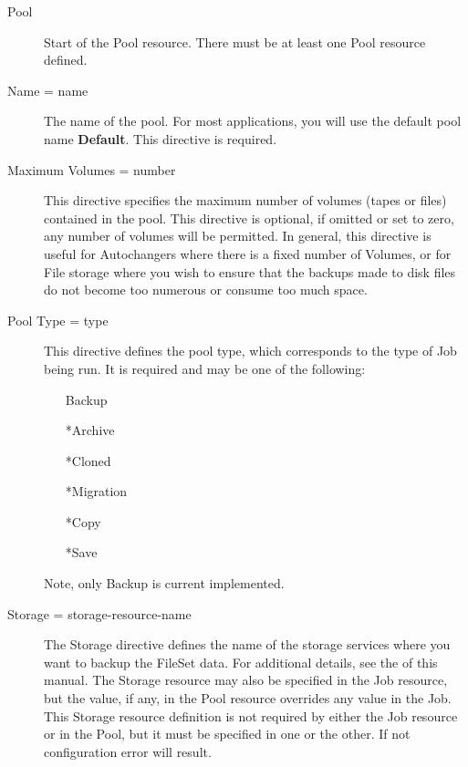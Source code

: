 \begin{description}

\item [Pool]
   Start of the Pool resource.  There must be at least one Pool resource
   defined.


\item [Name = \lt{}name\gt{}]
   The name of the pool.  For most applications, you will use the default
   pool name {\bf Default}.  This directive is required.

\label{MaxVolumes}
\item [Maximum Volumes = \lt{}number\gt{}]
   This directive specifies the maximum number of volumes (tapes or files)
   contained in the pool.  This directive is optional, if omitted or set to
   zero, any number of volumes will be permitted.  In general, this
   directive is useful for Autochangers where there is a fixed number of
   Volumes, or for File storage where you wish to ensure that the backups
   made to disk files do not become too numerous or consume too much space.

\item [Pool Type = \lt{}type\gt{}]
   This directive defines the pool type, which corresponds to the type of
   Job being run.  It is required and may be one of the following:

\begin{itemize}
  \item [Backup]  
  \item [*Archive]  
  \item [*Cloned]  
  \item [*Migration]  
  \item [*Copy]  
  \item [*Save]  
\end{itemize}
   Note, only Backup is current implemented.

\item [Storage = \lt{}storage-resource-name\gt{}]
   The Storage directive defines the name of the storage services where you
   want to backup the FileSet data.  For additional details, see the
    of this manual.
   The Storage resource may also be specified in the Job resource,
   but the value, if any, in the Pool resource overrides any value
   in the Job. This Storage resource definition is not required by either
   the Job resource or in the Pool, but it must be specified in
   one or the other.  If not configuration error will result.


\end{description}
